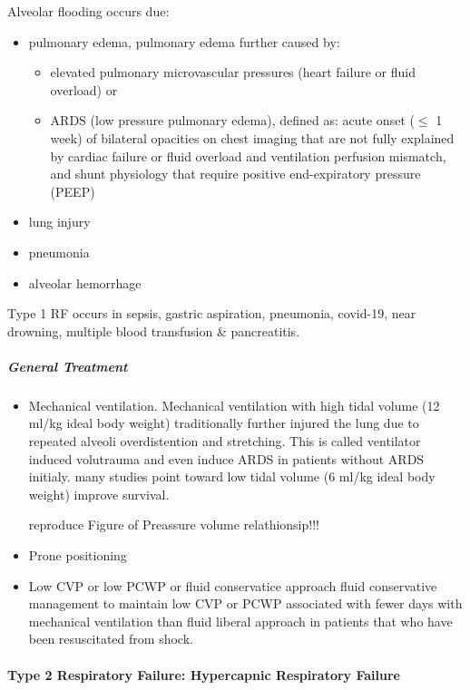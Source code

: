 \documentclass[
  letterpaper,
  DIV=11,
  numbers=noendperiod]{scrreprt}
\let\oldparagraph\paragraph
\renewcommand{\paragraph}[1]{\oldparagraph{#1}\mbox{}}
\let\oldsubparagraph\subparagraph
\renewcommand{\subparagraph}[1]{\oldsubparagraph{#1}\mbox{}}
\providecommand{\tightlist}{%
  \setlength{\itemsep}{0pt}\setlength{\parskip}{0pt}}\usepackage{longtable,booktabs,array}
\begin{document}
Alveolar flooding occurs due:

\begin{itemize}
\tightlist
\item
  pulmonary edema, pulmonary edema further caused by:

  \begin{itemize}
  \tightlist
  \item
    elevated pulmonary microvascular pressures (heart failure or fluid
    overload) or
  \item
    ARDS (low pressure pulmonary edema), defined as: acute onset
    (\(\le\) 1 week) of bilateral opacities on chest imaging that are
    not fully explained by cardiac failure or fluid overload and
    ventilation perfusion mismatch, and shunt physiology that require
    positive end-expiratory pressure (PEEP)
  \end{itemize}
\item
  lung injury
\item
  pneumonia
\item
  alveolar hemorrhage
\end{itemize}

Type 1 RF occurs in sepsis, gastric aspiration, pneumonia, covid-19,
near drowning, multiple blood transfusion \& pancreatitis.

\subparagraph{General Treatment}\label{general-treatment}

\begin{itemize}
\item
  Mechanical ventilation. Mechanical ventilation with high tidal volume
  (12 ml/kg ideal body weight) traditionally further injured the lung
  due to repeated alveoli overdistention and stretching. This is called
  ventilator induced volutrauma and even induce ARDS in patients without
  ARDS initialy. many studies point toward low tidal volume (6 ml/kg
  ideal body weight) improve survival.

  reproduce Figure of Preassure volume relathionsip!!!
\item
  Prone positioning
\item
  Low CVP or low PCWP or fluid conservatice approach fluid conservative
  management to maintain low CVP or PCWP associated with fewer days with
  mechanical ventilation than fluid liberal approach in patients that
  who have been resuscitated from shock.
\end{itemize}

\paragraph{Type 2 Respiratory Failure: Hypercapnic Respiratory
Failure}\label{type-2-respiratory-failure-hypercapnic-respiratory-failure}
\end{document}
